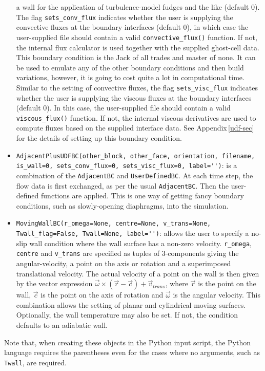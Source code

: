 \begin{itemize}
       a wall for the application of turbulence-model fudges and the like (default 0).
       The flag \verb!sets_conv_flux! indicates whether the user is supplying
       the convective fluxes at the boundary interfaces (default 0), in which case the user-supplied file should
       contain a valid \verb!convective_flux()! function.  
       If not, the internal flux calculator is used together with the supplied ghost-cell data.
       This boundary condition is the Jack of all trades and master of none.
       It can be used to emulate any of the other boundary conditions and then build
       variations, however, it is going to cost quite a lot in computational time.
       Similar to the setting of convective fluxes, the flag \verb!sets_visc_flux!
       indicates whether the user is supplying the viscous fluxes at the boundary interfaces (default 0).
       In this case, the user-supplied file should contain a valid \verb!viscous_flux()! function.
       If not, the internal viscous derivatives are used to compute fluxes based on the supplied interface data.
       See Appendix\,\ref{udf-sec} for the details of setting up this boundary condition.
    \item \verb!AdjacentPlusUDFBC(other_block, other_face, orientation, filename,!\\
          \verb!is_wall=0, sets_conv_flux=0, sets_visc_flux=0, label='')!: 
       is a combination of the \texttt{AdjacentBC} and \texttt{UserDefinedBC}.
       At each time step, the flow data is first exchanged, as per the usual
       \texttt{AdjacentBC}.  Then the user-defined functions are applied.
       This is one way of getting fancy boundary conditions, such as slowly-opening diaphragms,
       into the simulation.
    \item \verb!MovingWallBC(r_omega=None, centre=None, v_trans=None,!\\
          \verb!Twall_flag=False, Twall=None, label='')!:
       allows the user to specify a no-slip wall condition where the wall surface has a non-zero velocity.
       \verb!r_omega!, \verb!centre! and \verb!v_trans! are specified as tuples of 3-components giving
       the angular-velocity, a point on the axis or rotation and a superimposed translational velocity.
       The actual velocity of a point on the wall is then given by the vector expression 
       $\vec{\omega} \times (\vec{r} - \vec{c}) + \vec{v}_{trans}$,
       where $\vec{r}$ is the point on the wall, 
       $\vec{c}$ is the point on the axis of rotation and $\vec{\omega}$ is the angular velocity.
       This combination allows the setting of planar and cylindrical moving surfaces.
       Optionally, the wall temperature may also be set.  If not, the condition defaults to an adiabatic wall.
  \end{itemize}
Note that, 
when creating these objects in the Python input script, the Python language requires the parentheses
even for the cases where no arguments, such as \texttt{Twall}, are required.
  
